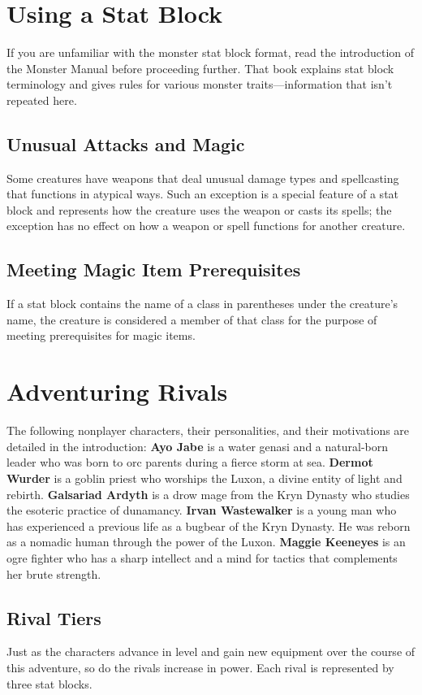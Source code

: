 \documentclass[10pt,a4,twoside,twocolumn,openany,nodeprecatedcode]{dndbook}
\begin{document}
\section{Using a Stat Block}
If you are unfamiliar with the monster stat block format, read the introduction of the Monster Manual before proceeding further. That book explains stat block terminology and gives rules for various monster traits—information that isn't repeated here.
\subsection{Unusual Attacks and Magic}
Some creatures have weapons that deal unusual damage types and spellcasting that functions in atypical ways. Such an exception is a special feature of a stat block and represents how the creature uses the weapon or casts its spells; the exception has no effect on how a weapon or spell functions for another creature.
\subsection{Meeting Magic Item Prerequisites}
If a stat block contains the name of a class in parentheses under the creature's name, the creature is considered a member of that class for the purpose of meeting prerequisites for magic items.
\section{Adventuring Rivals}
The following nonplayer characters, their personalities, and their motivations are detailed in the introduction:
\textbf{Ayo Jabe} is a water genasi and a natural-born leader who was born to orc parents during a fierce storm at sea.
\textbf{Dermot Wurder} is a goblin priest who worships the Luxon, a divine entity of light and rebirth.
\textbf{Galsariad Ardyth} is a drow mage from the Kryn Dynasty who studies the esoteric practice of dunamancy.
\textbf{Irvan Wastewalker} is a young man who has experienced a previous life as a bugbear of the Kryn Dynasty. He was reborn as a nomadic human through the power of the Luxon.
\textbf{Maggie Keeneyes} is an ogre fighter who has a sharp intellect and a mind for tactics that complements her brute strength.
\subsection{Rival Tiers}
Just as the characters advance in level and gain new equipment over the course of this adventure, so do the rivals increase in power. Each rival is represented by three stat blocks.
\end{document}
